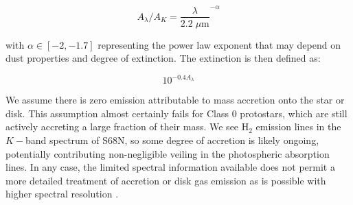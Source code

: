 \documentclass[twocolumn]{emulateapj}%
\begin{document}
$$ A_\lambda / A_K = \frac{\lambda}{2.2 \; \mu\mathrm{m}}^{-\alpha}$$

with $\alpha \in [-2, -1.7]$ representing the power law exponent that may depend on dust properties and degree of extinction.  The extinction is then defined as:

$$ 10^{-0.4 A_\lambda}$$

We assume there is zero emission attributable to mass accretion onto the star or disk.  This assumption almost certainly fails for Class 0 protostars, which are still actively accreting a large fraction of their mass.  We see H$_2$ emission lines in the $K-$band spectrum of S68N, so some degree of accretion is likely ongoing, potentially contributing non-negligible veiling in the photospheric absorption lines.  In any case, the limited spectral information available does not permit a more detailed treatment of accretion or disk gas emission as is possible with higher spectral resolution \citep[\emph{e.g.}]{2016ApJ...826..179L}.  
\end{document}
